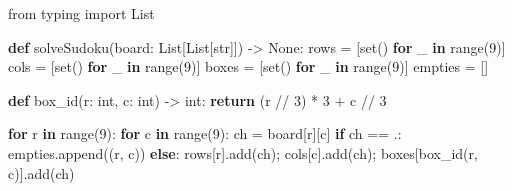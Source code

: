 \documentclass[11pt]{article}
\newenvironment{Shaded}{\begin{snugshade}}{\end{snugshade}}
\newcommand{\BuiltInTok}[1]{\textcolor[rgb]{0.50,0.55,0.55}{#1}}
\newcommand{\ControlFlowTok}[1]{\textcolor[rgb]{0.99,0.74,0.29}{\textbf{#1}}}
\newcommand{\DecValTok}[1]{\textcolor[rgb]{0.96,0.45,0.00}{#1}}
\newcommand{\ImportTok}[1]{\textcolor[rgb]{0.15,0.68,0.38}{#1}}
\newcommand{\KeywordTok}[1]{\textcolor[rgb]{0.81,0.81,0.76}{\textbf{#1}}}
\newcommand{\NormalTok}[1]{\textcolor[rgb]{0.81,0.81,0.76}{#1}}
\newcommand{\OperatorTok}[1]{\textcolor[rgb]{0.81,0.81,0.76}{#1}}
\newcommand{\StringTok}[1]{\textcolor[rgb]{0.96,0.31,0.31}{#1}}
\newcommand{\VariableTok}[1]{\textcolor[rgb]{0.15,0.68,0.68}{#1}}
\begin{document}

\begin{Shaded}
\begin{Highlighting}[]
\ImportTok{from}\NormalTok{ typing }\ImportTok{import}\NormalTok{ List}

\KeywordTok{def}\NormalTok{ solveSudoku(board: List[List[}\BuiltInTok{str}\NormalTok{]]) }\OperatorTok{{-}\textgreater{}} \VariableTok{None}\NormalTok{:}
\NormalTok{    rows }\OperatorTok{=}\NormalTok{ [}\BuiltInTok{set}\NormalTok{() }\ControlFlowTok{for}\NormalTok{ \_ }\KeywordTok{in} \BuiltInTok{range}\NormalTok{(}\DecValTok{9}\NormalTok{)]}
\NormalTok{    cols }\OperatorTok{=}\NormalTok{ [}\BuiltInTok{set}\NormalTok{() }\ControlFlowTok{for}\NormalTok{ \_ }\KeywordTok{in} \BuiltInTok{range}\NormalTok{(}\DecValTok{9}\NormalTok{)]}
\NormalTok{    boxes }\OperatorTok{=}\NormalTok{ [}\BuiltInTok{set}\NormalTok{() }\ControlFlowTok{for}\NormalTok{ \_ }\KeywordTok{in} \BuiltInTok{range}\NormalTok{(}\DecValTok{9}\NormalTok{)]}
\NormalTok{    empties }\OperatorTok{=}\NormalTok{ []}

    \KeywordTok{def}\NormalTok{ box\_id(r: }\BuiltInTok{int}\NormalTok{, c: }\BuiltInTok{int}\NormalTok{) }\OperatorTok{{-}\textgreater{}} \BuiltInTok{int}\NormalTok{:}
        \ControlFlowTok{return}\NormalTok{ (r }\OperatorTok{//} \DecValTok{3}\NormalTok{) }\OperatorTok{*} \DecValTok{3} \OperatorTok{+}\NormalTok{ c }\OperatorTok{//} \DecValTok{3}

    \ControlFlowTok{for}\NormalTok{ r }\KeywordTok{in} \BuiltInTok{range}\NormalTok{(}\DecValTok{9}\NormalTok{):}
        \ControlFlowTok{for}\NormalTok{ c }\KeywordTok{in} \BuiltInTok{range}\NormalTok{(}\DecValTok{9}\NormalTok{):}
\NormalTok{            ch }\OperatorTok{=}\NormalTok{ board[r][c]}
            \ControlFlowTok{if}\NormalTok{ ch }\OperatorTok{==} \StringTok{\textquotesingle{}.\textquotesingle{}}\NormalTok{:}
\NormalTok{                empties.append((r, c))}
            \ControlFlowTok{else}\NormalTok{:}
\NormalTok{                rows[r].add(ch)}\OperatorTok{;}\NormalTok{ cols[c].add(ch)}\OperatorTok{;}\NormalTok{ boxes[box\_id(r, c)].add(ch)}


\end{Highlighting}
\end{Shaded}
\end{document}
